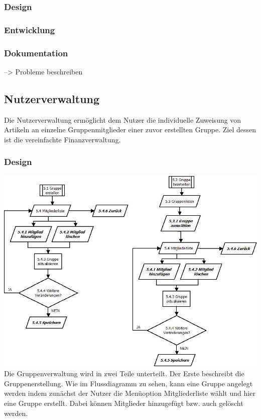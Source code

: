 \documentclass[12pt,a4paper]{article}
\begin{document}
\subsubsection*{Design}
\subsubsection*{Entwicklung}
\subsubsection*{Dokumentation} --> Probleme beschreiben
\newpage

\subsection{Nutzerverwaltung}
Die Nutzerverwaltung ermöglicht dem Nutzer die individuelle Zuweisung von Artikeln an einzelne Gruppenmitglieder einer zuvor erstellten Gruppe. Ziel dessen ist die vereinfachte Finanzverwaltung.

\subsubsection*{Design}
\includegraphics[scale=0.6, origin=l]{Gruppenverwaltung.jpeg}
\newline
\newline
Die Gruppenverwaltung wird in zwei Teile unterteilt. Der Erste beschreibt die Gruppenerstellung. Wie im Flussdiagramm zu sehen, kann eine Gruppe angelegt werden indem zunächst der Nutzer die Menüoption Mitgliederliste wählt und hier eine Gruppe erstellt. Dabei können Mitglieder hinzugefügt bzw. auch gelöscht werden.
\end{document}
